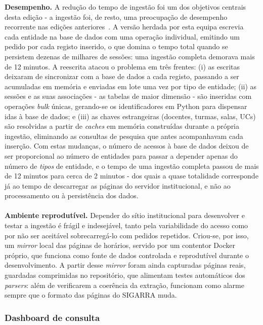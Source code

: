 \documentclass[10pt]{article}
\begin{document}
    \textbf{Desempenho.} A redução do tempo de ingestão foi um dos objetivos centrais desta edição - a ingestão foi, de resto, uma preocupação de desempenho recorrente nas edições anteriores~\cite{carvalho2023, correia2024}. A versão herdada por esta equipa escrevia cada entidade na base de dados com uma operação individual, emitindo um pedido por cada registo inserido, o que domina o tempo total quando se persistem dezenas de milhares de sessões: uma ingestão completa demorava mais de 12 minutos. A reescrita atacou o problema em três frentes: (i) as escritas deixaram de sincronizar com a base de dados a cada registo, passando a ser acumuladas em memória e enviadas em lote uma vez por tipo de entidade; (ii) as sessões e as suas associações - as tabelas de maior dimensão - são inseridas com operações \emph{bulk} únicas, gerando-se os identificadores em Python para dispensar idas à base de dados; e (iii) as chaves estrangeiras (docentes, turmas, salas, UCs) são resolvidas a partir de \emph{caches} em memória construídas durante a própria ingestão, eliminando as consultas de pesquisa que antes acompanhavam cada inserção. Com estas mudanças, o número de acessos à base de dados deixou de ser proporcional ao número de entidades para passar a depender apenas do número de \emph{tipos} de entidade, e o tempo de uma ingestão completa passou de mais de 12 minutos para cerca de 2 minutos - dos quais a quase totalidade corresponde já ao tempo de descarregar as páginas do servidor institucional, e não ao processamento ou à persistência dos dados.
    \\\\
    \textbf{Ambiente reprodutível.} Depender do sítio institucional para desenvolver e testar a ingestão é frágil e indesejável, tanto pela variabilidade do acesso como por não ser aceitável sobrecarregá-lo com pedidos repetidos. Criou-se, por isso, um \emph{mirror} local das páginas de horários, servido por um contentor Docker próprio, que funciona como fonte de dados controlada e reprodutível durante o desenvolvimento. A partir desse \emph{mirror} foram ainda capturadas páginas reais, guardadas comprimidas no repositório, que alimentam testes automáticos dos \emph{parsers}: além de verificarem a coerência da extração, funcionam como alarme sempre que o formato das páginas do SIGARRA muda.

\subsubsection{Dashboard de consulta}
\label{sec:dashboard}
\end{document}
